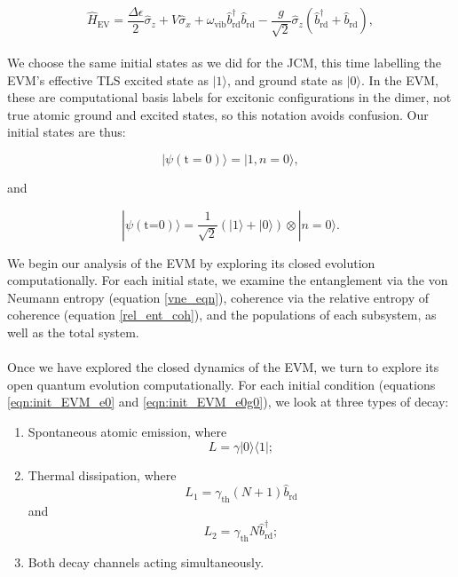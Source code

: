 \documentclass[11pt]{article}
\begin{document}
\begin{equation*}
    \hat{H}_{\scriptscriptstyle \text{EV}} = \frac{\Delta\epsilon}{2}\hat{\sigma}_z + V\hat{\sigma}_x + \omega_{\scriptscriptstyle \text{vib}} \hat{b}_{\scriptscriptstyle \text{rd}}^\dagger \hat{b}_{\scriptscriptstyle \text{rd}} -\frac{g}{\sqrt{2}}\hat{\sigma}_z\left(\hat{b}_{\scriptscriptstyle \text{rd}}^\dagger + \hat{b}_{\scriptscriptstyle \text{rd}}\right),
\end{equation*}
\\
We choose the same initial states as we did for the JCM, this time labelling the EVM's effective TLS excited state as $|1\rangle$, and ground state as $|0\rangle$. In the EVM, these are computational basis labels for excitonic configurations in the dimer, not true atomic ground and excited states, so this notation avoids confusion. Our initial states are thus:

\begin{equation} \label{eqn:init_EVM_e0}
    |\psi (\text{t}=0)\rangle = |1,n=0\rangle,
\end{equation}

and 

\begin{equation}\label{eqn:init_EVM_e0g0}
    |\psi (\text{t=0})\rangle = \frac{1}{\sqrt{2}}(|1\rangle + |0\rangle)\otimes|n=0\rangle.
\end{equation}

We begin our analysis of the EVM by exploring its closed evolution computationally. For each initial state, we examine the entanglement via the von Neumann entropy (equation \eqref{vne_eqn}), coherence via the relative entropy of coherence (equation \eqref{rel_ent_coh}), and the populations of each subsystem, as well as the total system.\\
\\
Once we have explored the closed dynamics of the EVM, we turn to explore its open quantum evolution computationally. For each initial condition (equations \eqref{eqn:init_EVM_e0} and \eqref{eqn:init_EVM_e0g0}), we look at three types of decay:

\begin{enumerate}
    \item Spontaneous atomic emission, where 
    \begin{equation*}
        L = \gamma|0\rangle\langle1|;
    \end{equation*}
    \item Thermal dissipation, where
    \begin{equation*}
        L_1 = \gamma_{\scriptscriptstyle \text{th}}(N+1)\hat{b}_{\scriptscriptstyle\text{rd}} 
    \end{equation*}
    and 
    \begin{equation*}
        L_2 = \gamma_{\scriptscriptstyle \text{th}}N\hat{b}_{\scriptscriptstyle\text{rd}} ^\dagger;
    \end{equation*}
    \item Both decay channels acting simultaneously.
\end{enumerate}
\end{document}
